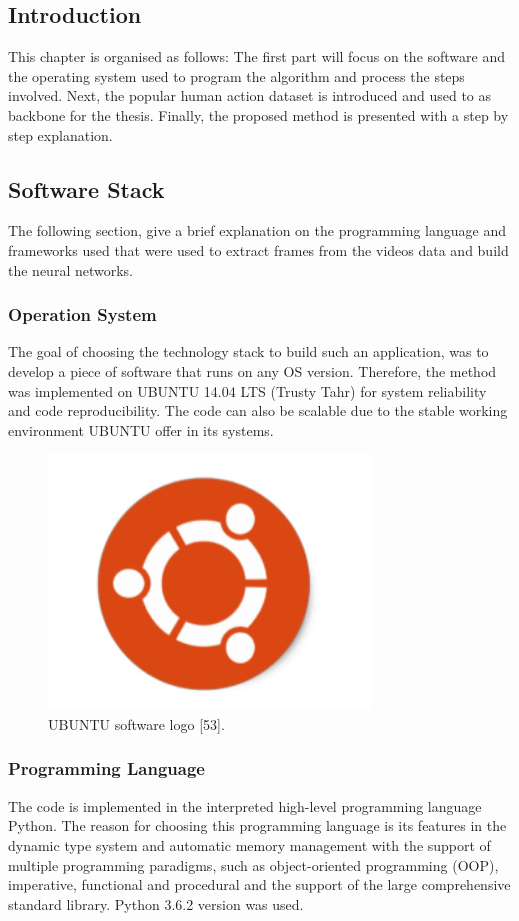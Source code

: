 \subsection{Introduction}
\hspace{5mm} This chapter is organised as follows: The first part will focus on the software and the operating system used to program the algorithm and process the steps involved. Next, the popular human action dataset is introduced and used to as backbone for the thesis. Finally, the proposed method is presented with a step by step explanation.
\subsection{Software Stack}
\hspace{5mm} The following section, give a brief explanation on the programming language and frameworks used that were used to extract frames from the videos data and build the neural networks.
\subsubsection{Operation System}
\hspace{5mm} The goal of choosing the technology stack to build such an application, was to develop a piece of software that runs on any OS version. Therefore, the method was implemented on UBUNTU 14.04 LTS (Trusty Tahr) for system reliability and code reproducibility. The code can also be scalable due to the stable working environment UBUNTU offer in its systems.
\begin{figure}[ht]
\centering
\includegraphics{Figures/u}
\decoRule
\caption[UBUNTU software logo "53".]{UBUNTU software logo [53].}
\label{fig:la}
\end{figure}

\subsubsection{Programming Language}
\hspace{5mm} The code is implemented in the interpreted high-level programming language Python. The reason for choosing this programming language is its features in the dynamic type system and automatic memory management with the support of multiple programming paradigms, such as object-oriented programming (OOP), imperative, functional and procedural and the support of the large comprehensive standard library.
Python 3.6.2 version was used.

